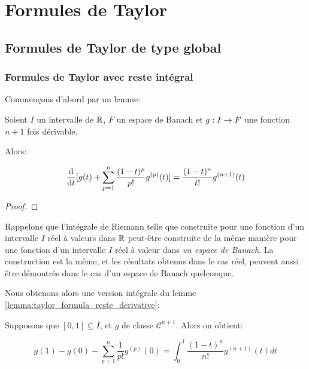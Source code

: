 \chapter{Formules de Taylor}

\section{Formules de Taylor de type global}

\subsection{Formules de Taylor avec reste intégral}

Commençons d'abord par un lemme:

\begin{lemma}
	\label{lemma:taylor_formula_reste_derivative}
	Soient $I$ un intervalle de $\mathbb{R}$, $F$ un espace de Banach et
	$g : I \rightarrow F$ une fonction $n+1$ fois dérivable.

	Alors:

	\begin{equation*}
		\displaystyle \dv{t} [g(t) + \sum_{p = 1}^{n} \frac{(1 - t)^{p}}{p!}
		g^{(p)}(t)] = \frac{(1 - t)^{n}}{t!} g^{(n+1)}(t)
	\end{equation*}
\end{lemma}

\ifdefined\outputproof
\begin{proof}

\end{proof}
\fi

Rappelons que l'intégrale de Riemann telle que construite pour une fonction d'un
intervalle $I$ réel à valeurs dans $\mathbb{R}$  peut-être construite de la même
manière pour une fonction d'un intervalle $I$ réel à valeur dans \textit{un
espace de Banach}. La construction est la même, et les résultats obtenus dans le
cas réel, peuvent aussi être démontrés dans le cas d'un espace de Banach
quelconque.

Nous obtenons alors une version intégrale du lemme
\ref{lemma:taylor_formula_reste_derivative}:

\begin{corollary}
	\label{corollary:taylor_formula_reste_integral}
	Supposons que $[0, 1] \subseteq I$, et $g$ de classe $\mathcal{C}^{n + 1}$.
	Alors on obtient:

	\begin{equation*}
		g(1) - g(0) - \displaystyle \sum_{p = 1}^{n} \frac{1}{p!} g^{(p)}(0) =
		\int_{0}^{1} \frac{(1 - t)^{n}}{n!} g^{(n + 1)}(t) dt
	\end{equation*}
\end{corollary}

